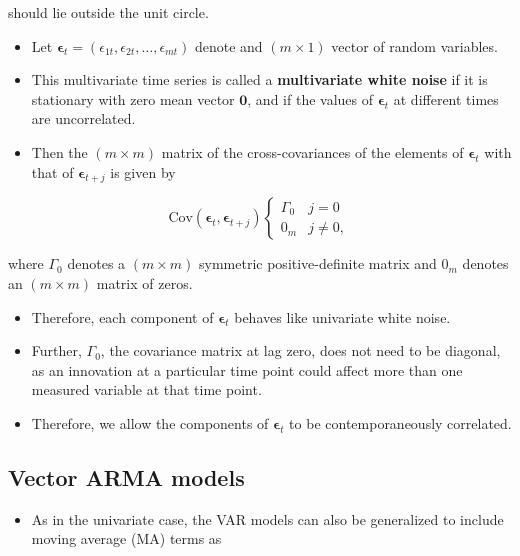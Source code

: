 \documentclass[]{book}
\providecommand{\tightlist}{%
  \setlength{\itemsep}{0pt}\setlength{\parskip}{0pt}}
\begin{document}
should lie outside the unit circle.

\begin{itemize}
\tightlist
\item
  Let \(\symbf{\epsilon}_t = (\epsilon_{1t}, \epsilon_{2t}, \dots, \epsilon_{mt})\) denote and \((m\times 1)\) vector of random variables.
\item
  This multivariate time series is called a \textbf{multivariate white noise} if it is stationary with zero mean vector \(\mathbf{0}\), and if the values of \(\symbf{\epsilon}_t\) at different times are uncorrelated.
\item
  Then the \((m\times m)\) matrix of the cross-covariances of the elements of \(\symbf{\epsilon}_t\) with that of \(\symbf{\epsilon}_{t+j}\) is given by
\end{itemize}

\[
\text{Cov}(\symbf{\epsilon}_t, \symbf{\epsilon}_{t+j})
\begin{cases}
    \Gamma_0 & j=0\\
   0_m & j\neq0,
\end{cases}
\]

where \(\Gamma_0\) denotes a \((m\times m)\) symmetric positive-definite matrix and \(0_m\)
denotes an \((m\times m)\) matrix of zeros.

\begin{itemize}
\tightlist
\item
  Therefore, each component of \(\symbf{\epsilon}_t\) behaves like univariate white noise.
\item
  Further, \(\Gamma_0\), the covariance matrix at lag zero, does not need to be diagonal, as an innovation at a particular time point could affect more than one measured variable at that time point.
\item
  Therefore, we allow the components of \(\symbf{\epsilon}_t\) to be contemporaneously correlated.
\end{itemize}

\hypertarget{vector-arma-models}{%
\subsection{Vector ARMA models}\label{vector-arma-models}}

\begin{itemize}
\tightlist
\item
  As in the univariate case, the VAR models can also be generalized to include moving average (MA) terms as
\end{itemize}
\end{document}
